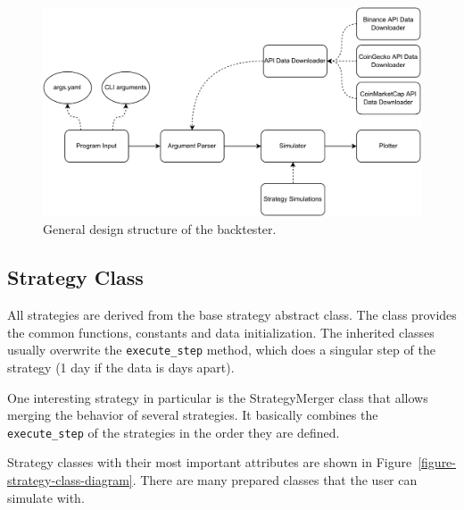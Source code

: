 \begin{figure}[!hbt]
    \centering
    \includegraphics[width=\columnwidth]{figures/structure-diagram.pdf}
    \caption{General design structure of the backtester.}
    \label{structure-diagram}
\end{figure}

\subsection*{Strategy Class}
All strategies are derived from the base strategy abstract class. The class provides the common functions, constants and data initialization. The inherited classes usually overwrite the \texttt{execute\_step} method, which does a singular step of the strategy (1 day if the data is days apart).

One interesting strategy in particular is the StrategyMerger class that allows merging the behavior of several strategies. It basically combines the \texttt{execute\_step} of the strategies in the order they are defined.

Strategy classes with their most important attributes are shown in Figure~\ref{figure-strategy-class-diagram}. There are many prepared classes that the user can simulate with.

